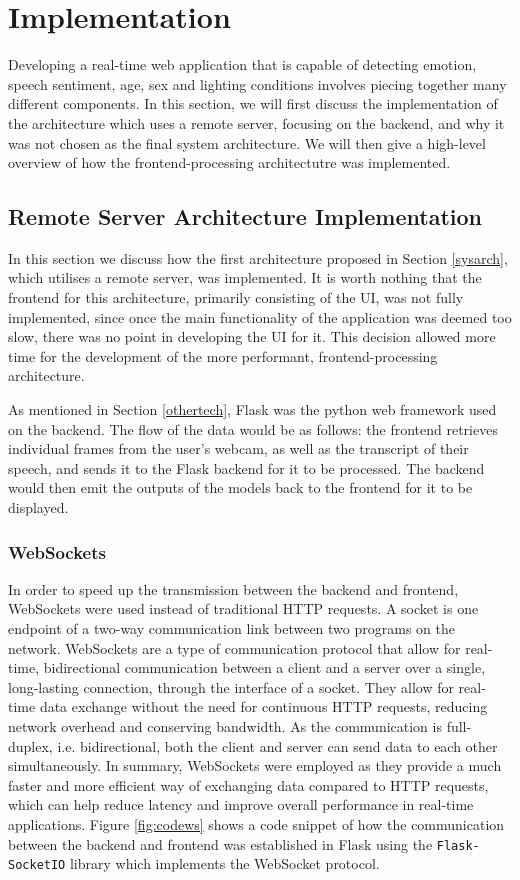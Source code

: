 \documentclass[12pt, a4paper]{article}
\newcommand{\np}
    {
    \vskip 0.4cm
    }
\begin{document}
\clearpage

\section{Implementation}
\label{implementation}

Developing a real-time web application that is capable of detecting emotion, speech sentiment, age, sex and lighting conditions involves piecing together many different components. In this section, we will first discuss the implementation of the architecture which uses a remote server, focusing on the backend, and why it was not chosen as the final system architecture. We will then give a high-level overview of how the frontend-processing architectutre was implemented.

\subsection{Remote Server Architecture Implementation}

In this section we discuss how the first architecture proposed in Section \ref{sysarch}, which utilises a remote server, was implemented. It is worth nothing that the frontend for this architecture, primarily consisting of the UI, was not fully implemented, since once the main functionality of the application was deemed too slow, there was no point in developing the UI for it. This decision allowed more time for the development of the more performant, frontend-processing architecture.
\np
As mentioned in Section \ref{othertech}, Flask was the python web framework used on the backend. The flow of the data would be as follows: the frontend retrieves individual frames from the user's webcam, as well as the transcript of their speech, and sends it to the Flask backend for it to be processed. The backend would then emit the outputs of the models back to the frontend for it to be displayed. 
\subsubsection{WebSockets}

In order to speed up the transmission between the backend and frontend, WebSockets were used instead of traditional HTTP requests. A socket is one endpoint of a two-way communication link between two programs on the network. WebSockets are a type of communication protocol that allow for real-time, bidirectional communication between a client and a server over a single, long-lasting connection, through the interface of a socket. They allow for real-time data exchange without the need for continuous HTTP requests, reducing network overhead and conserving bandwidth. As the communication is full-duplex, i.e. bidirectional, both the client and server can send data to each other simultaneously. In summary, WebSockets were employed as they provide a much faster and more efficient way of exchanging data compared to HTTP requests, which can help reduce latency and improve overall performance in real-time applications. Figure \ref{fig:codews} shows a code snippet of how the communication between the backend and frontend was established in Flask using the \verb+Flask-SocketIO+ library which implements the WebSocket protocol.
\end{document}
